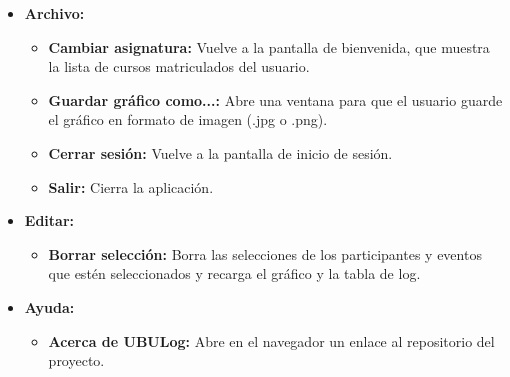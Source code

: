 \begin{itemize}
	\tightlist
	\item
	\textbf{Archivo:}
	\begin{itemize}
		\tightlist
		\item
		\textbf{Cambiar asignatura:} Vuelve a la pantalla de bienvenida, que muestra la lista de cursos matriculados del usuario.
		\item
		\textbf{Guardar gráfico como...:} Abre una ventana para que el usuario guarde el gráfico en formato de imagen (.jpg o .png).
		\item
		\textbf{Cerrar sesión:} Vuelve a la pantalla de inicio de sesión.
		\item
		\textbf{Salir:} Cierra la aplicación.
	\end{itemize}
	\item
	\textbf{Editar:}
	\begin{itemize}
		\tightlist
		\item
		\textbf{Borrar selección:} Borra las selecciones de los participantes y eventos que estén seleccionados y recarga el gráfico y la tabla de log.
	\end{itemize}
	\item
	\textbf{Ayuda:}
	\begin{itemize}
		\tightlist
		\item
		\textbf{Acerca de UBULog:} Abre en el navegador un enlace al repositorio del proyecto.
	\end{itemize}
\end{itemize}










